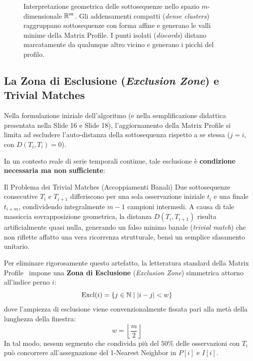 \begin{figure}[H]
\caption{Interpretazione geometrica delle sottosequenze nello spazio $m$-dimensionale $\mathbb{R}^m$. Gli addensamenti compatti (\textit{dense clusters}) raggruppano sottosequenze con forma affine e generano le valli minime della Matrix Profile. I punti isolati (\textit{discords}) distano marcatamente da qualunque altro vicino e generano i picchi del profilo.}
\label{fig:ts-geometry-rm}
\end{figure}

\FloatBarrier
\subsection{La Zona di Esclusione (\textit{Exclusion Zone}) e Trivial Matches}
\label{subsec:ts-exclusion-zone}

Nella formulazione iniziale dell'algoritmo (e nella semplificazione didattica presentata nella Slide 16 e Slide 18), l'aggiornamento della Matrix Profile si limita ad escludere l'auto-distanza della sottosequenza rispetto a se stessa ($j = i$, con $D(T_i, T_i) = 0$).

In un contesto reale di serie temporali continue, tale esclusione \`e \textbf{condizione necessaria ma non sufficiente}:
\begin{alertblock}{Il Problema dei Trivial Matches (Accoppiamenti Banali)}
Due sottosequenze consecutive $T_i$ e $T_{i+1}$ differiscono per una sola osservazione iniziale $t_i$ e una finale $t_{i+m}$, condividendo integralmente $m - 1$ campioni intermedi. A causa di tale massiccia sovrapposizione geometrica, la distanza $D(T_i, T_{i+1})$ risulta artificialmente quasi nulla, generando un falso minimo banale (\textit{trivial match}) che non riflette affatto una vera ricorrenza strutturale, bens\`i un semplice sfasamento unitario.
\end{alertblock}

Per eliminare rigorosamente questo artefatto, la letteratura standard della Matrix Profile~\cite{yeh2016} impone una \textbf{Zona di Esclusione} (\textit{Exclusion Zone}) simmetrica attorno all'indice perno $i$:
\begin{equation}
\label{eq:exclusion-zone}
\text{Excl}(i) = \{ j \in \mathbb{N} \mid |i - j| < w \}
\end{equation}
dove l'ampiezza di esclusione viene convenzionalmente fissata pari alla met\`a della lunghezza della finestra:
\begin{equation}
w = \left\lfloor \frac{m}{2} \right\rfloor
\end{equation}
In tal modo, nessun segmento che condivida pi\`u del $50\%$ delle osservazioni con $T_i$ pu\`o concorrere all'assegnazione del 1-Nearest Neighbor in $P[i]$ e $I[i]$.

